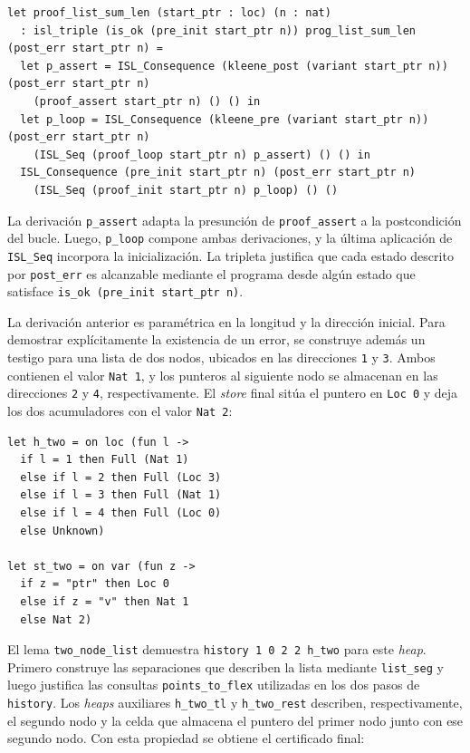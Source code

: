 \documentclass[a4paper,	11pt]{report}
\begin{document}
\begin{lstlisting}
let proof_list_sum_len (start_ptr : loc) (n : nat)
  : isl_triple (is_ok (pre_init start_ptr n)) prog_list_sum_len (post_err start_ptr n) =
  let p_assert = ISL_Consequence (kleene_post (variant start_ptr n)) (post_err start_ptr n)
    (proof_assert start_ptr n) () () in
  let p_loop = ISL_Consequence (kleene_pre (variant start_ptr n)) (post_err start_ptr n)
    (ISL_Seq (proof_loop start_ptr n) p_assert) () () in
  ISL_Consequence (pre_init start_ptr n) (post_err start_ptr n)
    (ISL_Seq (proof_init start_ptr n) p_loop) () ()
\end{lstlisting}
La derivación \lstinline|p_assert| adapta la presunción de \lstinline|proof_assert| a la postcondición del bucle.
Luego,
\lstinline|p_loop| compone ambas derivaciones,
y la última aplicación de \lstinline|ISL_Seq| incorpora la inicialización.
La tripleta justifica que cada estado descrito por \lstinline|post_err| es alcanzable mediante el programa desde algún estado que satisface
\lstinline|is_ok (pre_init start_ptr n)|.

La derivación anterior es paramétrica en la longitud y la dirección inicial.
Para demostrar explícitamente la existencia de un error,
se construye además un testigo para una lista de dos nodos,
ubicados en las direcciones \lstinline|1| y \lstinline|3|.
Ambos contienen el valor \lstinline|Nat 1|,
y los punteros al siguiente nodo se almacenan en las direcciones \lstinline|2| y \lstinline|4|, respectivamente.
El \emph{store} final sitúa el puntero en \lstinline|Loc 0| y deja los dos acumuladores con el valor \lstinline|Nat 2|:

\begin{lstlisting}
let h_two = on loc (fun l ->
  if l = 1 then Full (Nat 1)
  else if l = 2 then Full (Loc 3)
  else if l = 3 then Full (Nat 1)
  else if l = 4 then Full (Loc 0)
  else Unknown)

let st_two = on var (fun z ->
  if z = "ptr" then Loc 0
  else if z = "v" then Nat 1
  else Nat 2)
\end{lstlisting}

El lema \lstinline|two_node_list| demuestra \lstinline|history 1 0 2 2 h_two| para este \emph{heap}.
Primero construye las separaciones que describen la lista mediante \lstinline|list_seg|
y luego justifica las consultas \lstinline|points_to_flex| utilizadas en los dos pasos de \lstinline|history|.
Los \emph{heaps} auxiliares \lstinline|h_two_tl| y \lstinline|h_two_rest| describen,
respectivamente,
el segundo nodo y la celda que almacena el puntero del primer nodo junto con ese segundo nodo.
Con esta propiedad se obtiene el certificado final:
\end{document}
